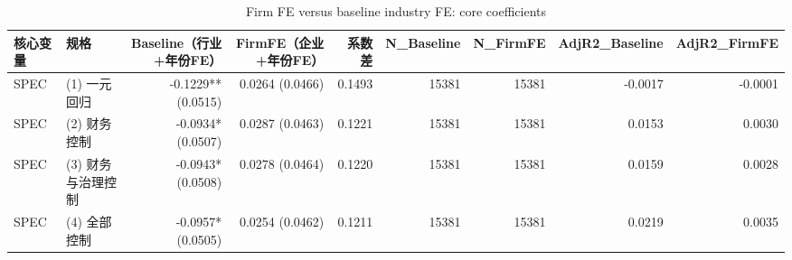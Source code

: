 \begin{table}
\caption{Firm FE versus baseline industry FE: core coefficients}
\label{tab:firm-fe-vs-baseline}
\begin{tabular}{llrrrrrrr}
\toprule
核心变量 & 规格 & Baseline（行业+年份FE） & FirmFE（企业+年份FE） & 系数差 & N\_Baseline & N\_FirmFE & AdjR2\_Baseline & AdjR2\_FirmFE \\
\midrule
SPEC & (1) 一元回归 & -0.1229** (0.0515) & 0.0264 (0.0466) & 0.1493 & 15381 & 15381 & -0.0017 & -0.0001 \\
SPEC & (2) 财务控制 & -0.0934* (0.0507) & 0.0287 (0.0463) & 0.1221 & 15381 & 15381 & 0.0153 & 0.0030 \\
SPEC & (3) 财务与治理控制 & -0.0943* (0.0508) & 0.0278 (0.0464) & 0.1220 & 15381 & 15381 & 0.0159 & 0.0028 \\
SPEC & (4) 全部控制 & -0.0957* (0.0505) & 0.0254 (0.0462) & 0.1211 & 15381 & 15381 & 0.0219 & 0.0035 \\
\bottomrule
\end{tabular}
\end{table}
